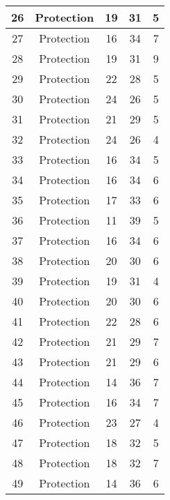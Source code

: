 \documentclass[results.tex]{subfiles}
\begin{document}
\begin{center}
\begin{tabular}{| c || c | c | c | c |}
    \hline
    26 & Protection & 19 & 31 & 5 \\ 
    \hline
    27 & Protection & 16 & 34 & 7 \\ 
    \hline
    28 & Protection & 19 & 31 & 9 \\ 
    \hline
    29 & Protection & 22 & 28 & 5 \\ 
    \hline
    30 & Protection & 24 & 26 & 5 \\ 
    \hline
    31 & Protection & 21 & 29 & 5 \\ 
    \hline
    32 & Protection & 24 & 26 & 4 \\ 
    \hline
    33 & Protection & 16 & 34 & 5 \\ 
    \hline
    34 & Protection & 16 & 34 & 6 \\ 
    \hline
    35 & Protection & 17 & 33 & 6 \\ 
    \hline
    36 & Protection & 11 & 39 & 5 \\ 
    \hline
    37 & Protection & 16 & 34 & 6 \\ 
    \hline
    38 & Protection & 20 & 30 & 6 \\ 
    \hline
    39 & Protection & 19 & 31 & 4 \\ 
    \hline
    40 & Protection & 20 & 30 & 6 \\ 
    \hline
    41 & Protection & 22 & 28 & 6 \\ 
    \hline
    42 & Protection & 21 & 29 & 7 \\ 
    \hline
    43 & Protection & 21 & 29 & 6 \\ 
    \hline
    44 & Protection & 14 & 36 & 7 \\ 
    \hline
    45 & Protection & 16 & 34 & 7 \\ 
    \hline
    46 & Protection & 23 & 27 & 4 \\ 
    \hline
    47 & Protection & 18 & 32 & 5 \\ 
    \hline
    48 & Protection & 18 & 32 & 7 \\ 
    \hline
    49 & Protection & 14 & 36 & 6 \\ 
    \hline   \end{tabular}
\end{center}
\end{document}
